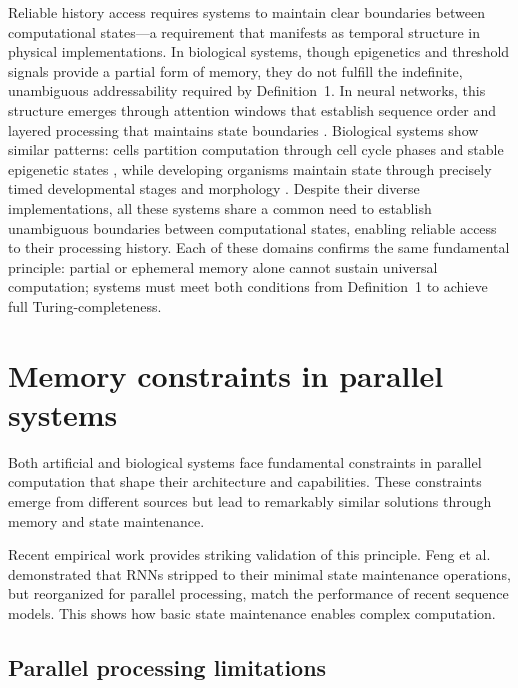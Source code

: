 \documentclass[12pt]{article}
\begin{document}
Reliable history access requires systems to maintain clear boundaries between computational states---a requirement that manifests as temporal structure in physical implementations.
In biological systems, though epigenetics and threshold signals provide a partial form of memory, they do not fulfill the indefinite, unambiguous addressability required by Definition~1. In neural networks, this structure emerges through attention windows that establish sequence order and layered processing that maintains state boundaries \cite{martini2015information,quentin2019differential}.
Biological systems show similar patterns: cells partition computation through cell cycle phases and stable epigenetic states \cite{bruno2022epigenetic}, while developing organisms maintain state through precisely timed developmental stages and morphology \cite{turing1952chemical}.
Despite their diverse implementations, all these systems share a common need to establish unambiguous boundaries between computational states, enabling reliable access to their processing history. Each of these domains confirms the same fundamental principle: partial or ephemeral memory alone cannot sustain universal computation; systems must meet both conditions from Definition~1 to achieve full Turing-completeness.

\section{Memory constraints in parallel systems}

Both artificial and biological systems face fundamental constraints in parallel computation that shape their architecture and capabilities.
These constraints emerge from different sources but lead to remarkably similar solutions through memory and state maintenance.

Recent empirical work provides striking validation of this principle.
Feng et al. \cite{feng2024rnns} demonstrated that RNNs stripped to their minimal state maintenance operations, but reorganized for parallel processing, match the performance of recent sequence models.
This shows how basic state maintenance enables complex computation.

\subsection{Parallel processing limitations}
\end{document}
